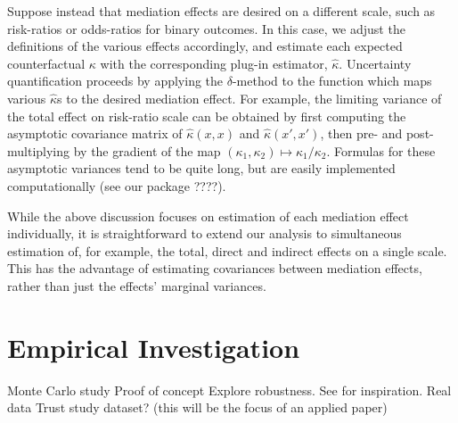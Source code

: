 \documentclass{article}
\begin{document}
Suppose instead that mediation effects are desired on a different scale, such as risk-ratios or odds-ratios for binary outcomes. In this case, we adjust the definitions of the various effects accordingly, and estimate each expected counterfactual $\kappa$ with the corresponding plug-in estimator, $\hat{\kappa}$. Uncertainty quantification proceeds by applying the $\delta$-method to the function which maps various $\hat{\kappa}$s to the desired mediation effect. For example, the limiting variance of the total effect on risk-ratio scale can be obtained by first computing the asymptotic covariance matrix of $\hat{\kappa}(x,x)$ and $\hat{\kappa}(x',x')$, then pre- and post-multiplying by the gradient of the map $(\kappa_1, \kappa_2) \mapsto \kappa_1 / \kappa_2$. Formulas for these asymptotic variances tend to be quite long, but are easily implemented computationally (see our package ????).

While the above discussion focuses on estimation of each mediation effect individually, it is straightforward to extend our analysis to simultaneous estimation of, for example, the total, direct and indirect effects on a single scale. This has the advantage of estimating covariances between mediation effects, rather than just the effects' marginal variances.



\section{Empirical Investigation}

\begin{outline}
    \1 Monte Carlo study
        \2 Proof of concept
        \2 Explore robustness. See \citet{Sam23} for inspiration.
    \1 Real data
        \2 Trust study dataset? (this will be the focus of an applied paper)
\end{outline}


\end{document}
